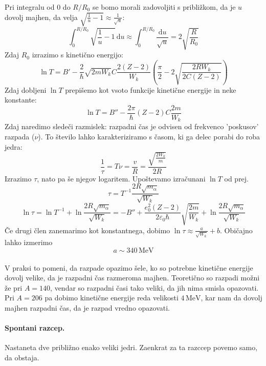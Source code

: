 \documentclass[a4paper]{article}
\newcommand{\dif}{\mathrm{d}}
\begin{document}
Pri integralu od \(0\) do \(R/R_0\) se bomo morali zadovoljiti s približkom, da je \(u\) dovolj majhen, da velja \(\displaystyle{\sqrt{\frac{1}{u} - 1} \approx \frac{1}{\sqrt{u}}}\):
\[\int_{0}^{R/R_0}\sqrt{\frac{1}{u} - 1}\,\dif u \approx \int_{0}^{R/R_0}\frac{\dif u}{\sqrt{u}} = 2\sqrt{\frac{R}{R_0}}\]
Zdaj \(R_0\) izrazimo s kinetično energijo:
\[\ln T = B' - \frac{2}{\hbar}\sqrt{2mW_k}C\frac{2(Z-2)}{W_k}\left(\frac{\pi}{2} - 2\sqrt{\frac{2RW_k}{2C(Z-2)}}\right)\]
Zdaj dobljeni \(\ln T\) prepišemo kot vsoto funkcije kinetične energije in neke konstante:
\[\ln T = B'' - \frac{2\pi}{\hbar}(Z-2)C\frac{2m}{W_k}\]
Zdaj naredimo sledeči razmislek: razpadni čas je odvisen od frekvenco 'poskusov' razpada (\(\nu\)). To število lahko karakteriziramo s časom, ki ga delec porabi do roba jedra:
\[\frac{1}{\tau} = T\nu = \frac{v}{R} = \frac{\sqrt{\frac{2W_k}{m}}}{2R}\]
Izrazimo \(\tau\), nato pa še njegov logaritem. Upoštevamo izračunani \(\ln T\) od prej.
\[\tau = T^{-1} \frac{2R\sqrt{m_\alpha}}{\sqrt{W_k}}\]
\[\ln\tau = \ln T^{-1} + \ln\frac{2R\sqrt{m_\alpha}}{\sqrt{W_k}} = -B'' + \frac{e_0^2(Z-2)}{2\varepsilon_0\hbar} \sqrt{\frac{2m}{W_k}} + \ln\frac{2R\sqrt{m_\alpha}}{\sqrt{W_k}}\]
Če drugi člen zanemarimo kot konstantnega, dobimo \(\displaystyle{\ln\tau \approx \frac{a}{\sqrt{W_k}} + b}\). Običajno lahko izmerimo \[a \sim 340\,\mathrm{MeV}\] \\[3mm]
V praksi to pomeni, da razpade opazimo šele, ko so potrebne kinetične energije dovolj velike, da je razpadni čas razmeroma majhen.
Teoretično so razpadi možni že pri \(A = 140\), vendar so razpadni časi tako veliki, da jih nima smisla opazovati.
Pri \(A = 206\) pa dobimo kinetične energije reda velikosti \(4\,\mathrm{MeV}\), kar nam da dovolj majhen razpadni čas, da je razpad vredno opazovati.
\paragraph{Spontani razcep.} Nastaneta dve približno enako veliki jedri. Zaenkrat za ta razccep povemo samo, da obstaja.
\end{document}
